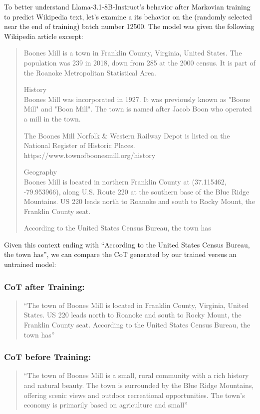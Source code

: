\documentclass{article} %
\begin{document}
To better understand Llama-3.1-8B-Instruct's behavior after Markovian training to predict Wikipedia text, let's examine a its behavior on the (randomly selected near the end of training) batch number 12500. The model was given the following Wikipedia article excerpt:

\begin{quote}
Boones Mill is a town in Franklin County, Virginia, United States. The population was 239 in 2018, down from 285 at the 2000 census. It is part of the Roanoke Metropolitan Statistical Area.

History\\
Boones Mill was incorporated in 1927. It was previously known as "Boone Mill" and "Boon Mill". The town is named after Jacob Boon who operated a mill in the town.

The Boones Mill Norfolk \& Western Railway Depot is listed on the National Register of Historic Places.
https://www.townofboonesmill.org/history

Geography\\
Boones Mill is located in northern Franklin County at  (37.115462, -79.953966), along U.S. Route 220 at the southern base of the Blue Ridge Mountains. US 220 leads north  to Roanoke and south  to Rocky Mount, the Franklin County seat.

According to the United States Census Bureau, the town has
\end{quote}

Given this context ending with ``According to the United States Census Bureau, the town has'', we can compare the CoT generated by our trained versus an untrained model:

\subsubsection{CoT after Training:}
\begin{quote}
``The town of Boones Mill is located in Franklin County, Virginia, United States. US 220 leads north to Roanoke and south to Rocky Mount, the Franklin County seat. According to the United States Census Bureau, the town has''
\end{quote}

\subsubsection{CoT before Training:}
\begin{quote}
``The town of Boones Mill is a small, rural community with a rich history and natural beauty. The town is surrounded by the Blue Ridge Mountains, offering scenic views and outdoor recreational opportunities. The town's economy is primarily based on agriculture and small''
\end{quote}
\end{document}
